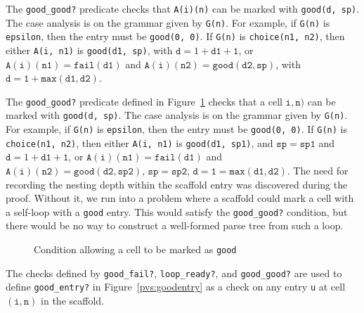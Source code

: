 \documentclass[sigplan,10pt,anonymous,review]{acmart}\settopmatter{printfolios=true,printccs=false,printacmref=false}
\begin{document}
\begin{CCSXML}
% 			

                      The \texttt{good\_good?} predicate checks that \texttt{A(i)(n)} can be marked
                      with \texttt{good(d, sp)}\@.  The case analysis is on the grammar given by \texttt{G(n)}\@.  For example, if \texttt{G(n)} is \texttt{epsilon}, then the entry must be \texttt{good(0, 0)}\@.  If \texttt{G(n)} is \texttt{choice(n1, n2)}, then either \texttt{A(i, n1)} is \texttt{good(d1, sp)}, with $\mathtt{d} = 1 + \mathtt{d1 + 1}$, or
$\mathtt{A(i)(n1)} = \mathtt{fail(d1)}$ and $\mathtt{A(i)(n2)} = \mathtt{good(d2, sp)}$, with $\mathtt{d} = \mathtt{1 + max(d1, d2)}$\@.  
                      



The \texttt{good\_good?} predicate defined in
Figure~\ref{pvs:goodgood} checks that a cell $\mathtt{i, n})$ can be
marked with \texttt{good(d, sp)}\@.  The case analysis is on the
grammar given by \texttt{G(n)}\@.  For example, if \texttt{G(n)} is
\texttt{epsilon}, then the entry must be \texttt{good(0, 0)}\@.  If
\texttt{G(n)} is \texttt{choice(n1, n2)}, then either \texttt{A(i,
  n1)} is \texttt{good(d1, sp1)}, and $\mathtt{sp} = \mathtt{sp1}$ and
$\mathtt{d} = 1 + \mathtt{d1 + 1}$, or
$\mathtt{A(i)(n1)} = \mathtt{fail(d1)}$ and
$\mathtt{A(i)(n2)} = \mathtt{good(d2, sp2)}$,
$\mathtt{sp} = \mathtt{sp2}$,
$\mathtt{d} = \mathtt{1 = max(d1, d2)}$\@.
The need for recording the nesting depth within the scaffold entry was
discovered during the proof.  Without it, we run into a problem where
a scaffold could mark a cell with a self-loop with a \texttt{good} entry. 
This would satisfy the \texttt{good\_good?} condition, but there would be no
way to construct a well-formed parse tree from such a loop.  

\begin{figure}[h!]
  
    \vspace*{-4mm}
			\caption{Condition allowing a cell to be marked as \texttt{good}}
			\label{pvs:goodgood}
\end{figure}

The checks defined by \texttt{good\_fail?}, \texttt{loop\_ready?}, and \texttt{good\_good?} are used to define \texttt{good\_entry?} in Figure~\ref{pvs:goodentry}
as a check on any entry \texttt{u}
at cell $(\mathtt{i, n})$ in the scaffold.  


\end{CCSXML}
\end{document}
